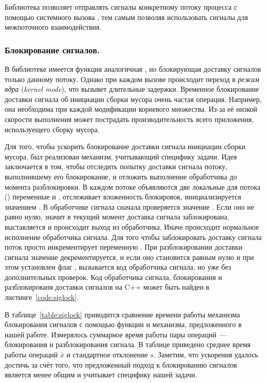 Библиотека  позволяет отправлять сигналы конкретному потоку процесса с 
помощью системного вызова , тем самым позволяя использовать сигналы 
для межпоточного взаимодействия.


\subsubsection{Блокирование сигналов.}
В библиотеке  имеется функция  аналогичная 
, но блокирующая доставку сигналов только данному потоку. 
Однако при каждом вызове  происходит переход в \emph{режим ядра} 
(\emph{kernel mode}), что вызывет длительные задержки. 
Временное блокирование доставки сигнала об инициации сборки мусора очень частая операция. 
Например, она необходима при каждой модификации корневого множества. 
Из-за её низкой скорости выполнения может пострадать производительность всего приложения, 
используещего сборку мусора. 

Для того, чтобы ускорить блокирование доставки сигнала инициации сборки мусора, был 
реализован механизм, учитывающий специфику задачи. 
Идея заключается в том, чтобы отследить попытку доставки сигнала потоку, выполнившему его 
блокирование, и отложить выполнение обработчика до момента разблокировки. 
В каждом потоке объявляются две локальные для потока () переменные 
 и .  отслеживает вложенность блокировок, 
 инициализируется значением . 
В обработчике сигнала сначала проверяется значение . 
Если оно не равно нулю, значит в текущий момент доставка сигнала заблокирована, 
выставляется  и происходит выход из обработчика. 
Иначе происходит нормальное исполнение обработчика сигнала. 
Для того чтобы заблокировать доставку сигнала поток просто инкрементирует переменную 
. 
При разблокировании доставки сигнала значение  декрементируется, и если оно 
становится равным нулю и при этом установлен флаг , вызывается код 
обработчика сигнала, но уже без дополнительных проверок. 
Код обработчика сигнала, блокирования и разблокированя доставки сигналов на C++ может быть 
найден в листинге~\ref{code:siglock}.

В таблице~\ref{table:siglock} приводится сравнение времени работы механизма блокирования 
сигналов с помощью функции  и механизма, предложенного в нашей работе. 
Измерялось суммарное время работы пары операций~--- блокирования и разблокирования сигнала. 
В таблице приведено среднее время работы операций $\bar{x}$ и стандартное отклонение $s$. 
Заметим, что ускорения удалось достичь за счёт того, что предложенный подход к блокированию 
сигналов является менее общим и учитывает специфику нашей задачи.

